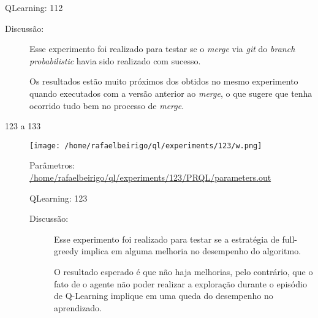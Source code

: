 \documentclass[11pt]{article}
\begin{document}
\begin{description}
\begin{description}
\begin{description}
\begin{description}
\begin{description}
\end{description}
\begin{description}

\item[QLearning: 112]\label{sec-11.1.2.1.3.1.3.2}


\end{description}
\begin{description}

\item[Discussão:]\label{sec-11.1.2.1.3.1.3.3}


Esse experimento foi realizado para testar se o \emph{merge} via \emph{git} do \emph{branch}
\emph{probabilistic} havia sido realizado com sucesso.

Os resultados estão muito próximos dos obtidos no mesmo experimento quando
executados com a versão anterior ao \emph{merge}, o que sugere que tenha ocorrido
tudo bem no processo de \emph{merge}.

\end{description}
\end{description}
\begin{description}

\item[123 a 133]\label{sec-11.1.2.1.3.1.4}


\centerline{\texttt{[image: /home/rafaelbeirigo/ql/experiments/123/w.png]}}


\begin{description}

\item[Parâmetros: \href{file:///home/rafaelbeirigo/ql/experiments/123/PRQL/parameters.out}{/home/rafaelbeirigo/ql/experiments/123/PRQL/parameters.out}]\label{sec-11.1.2.1.3.1.4.1}


\end{description}
\begin{description}

\item[QLearning: 123]\label{sec-11.1.2.1.3.1.4.2}


\end{description}
\begin{description}

\item[Discussão:]\label{sec-11.1.2.1.3.1.4.3}


Esse experimento foi realizado para testar se a estratégia de full-greedy implica
em alguma melhoria no desempenho do algoritmo.

O resultado esperado é que não haja melhorias, pelo contrário, que o fato de o
agente não poder realizar a exploração durante o episódio de Q-Learning implique
em uma queda do desempenho no aprendizado.


\end{description}
\end{description}
\end{description}
\end{description}
\end{description}
\end{document}
